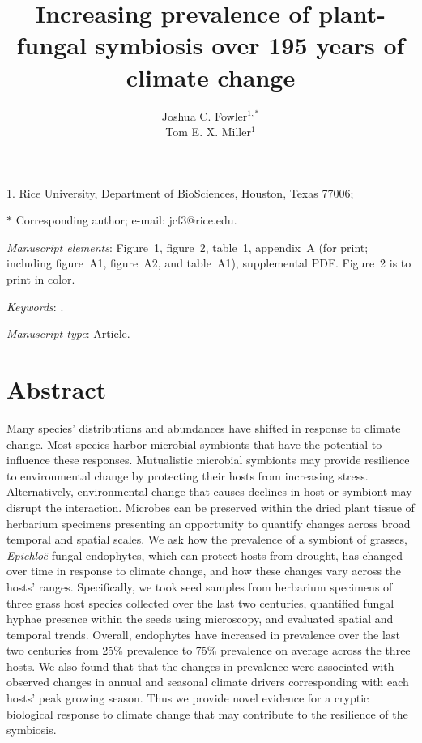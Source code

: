 \documentclass[11pt]{article}
\title{Increasing prevalence of plant-fungal symbiosis over 195 years of climate change}
\author{Joshua C. Fowler$^{1,\ast}$ \\
	Tom E. X. Miller$^{1}$}
\date{}
\begin{document}
	
	\maketitle
	
	\noindent{} 1. Rice University, Department of BioSciences, Houston, Texas 77006;


	\noindent{} $\ast$ Corresponding author; e-mail: jcf3@rice.edu.
	
	\bigskip
	
	\textit{Manuscript elements}: Figure~1, figure~2, table~1, appendix~A (for print; including figure~A1, figure~A2, and table~A1), supplemental PDF. Figure~2 is to print in color.
	
	\bigskip
	
	\textit{Keywords}: .
	
	\bigskip
	
	\textit{Manuscript type}: Article. %
	
	\bigskip
	
	
	
	\newpage{}
	
	\section*{Abstract}
Many species' distributions and abundances have shifted in response to climate change. 
Most species harbor microbial symbionts that have the potential to influence these responses.
Mutualistic microbial symbionts may provide resilience to environmental change by protecting their hosts from increasing stress. Alternatively, environmental change that causes declines in host or symbiont may disrupt the interaction. 
Microbes can be preserved within the dried plant tissue of herbarium specimens presenting an opportunity to quantify changes across broad temporal and spatial scales. 
We ask how the prevalence of a symbiont of grasses, \emph{Epichloë} fungal endophytes, which can protect hosts from drought, has changed over time in response to climate change, and how these changes vary across the hosts' ranges.
Specifically, we took seed samples from herbarium specimens of three grass host species collected over the last two centuries, quantified fungal hyphae presence within the seeds using microscopy, and evaluated spatial and temporal trends. 
Overall, endophytes have increased in prevalence over the last two centuries from 25\% prevalence to 75\% prevalence on average across the three hosts.
We also found that that the changes in prevalence were associated with observed changes in annual and seasonal climate drivers corresponding with each hosts' peak growing season. 
Thus we provide novel evidence for a cryptic biological response to climate change that may contribute to the resilience of the symbiosis.
	
\end{document}
